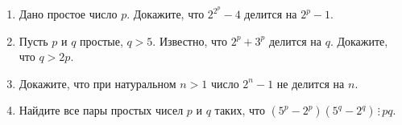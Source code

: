 \documentclass{article}
\begin{document}
\begin{enumerate}[label*=\protect\fbox{\arabic{enumi}}]
	\item Дано простое число $ p $. Докажите, что $2^{2^p} - 4$ делится на $2^p - 1$.

	\item Пусть $ p $ и $ q $ простые, $ q > 5 $. Известно, что $ 2^p +3^p $ делится на $ q $.
	Докажите, что $ q > 2p $.
	
	\item Докажите, что при натуральном $ n > 1 $ число $ 2^n - 1 $ не делится на $ n $.
	
	\item Найдите все пары простых чисел $ p $ и $ q $ таких, что $ (5^p - 2^p)(5^q - 2^q) \,\vdots\, pq $.
	
\end{enumerate}
\end{document}
